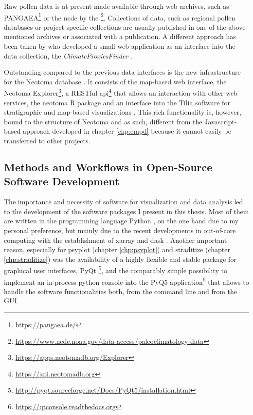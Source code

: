 \begin{refsection}
Raw pollen data is at present made available through web archives, such as PANGAEA\footnote{\url{https://pangaea.de/}} or the \gls{ncdc} by the \footnote{\url{https://www.ncdc.noaa.gov/data-access/paleoclimatology-data}}. Collections of data, such as regional pollen databases or project specific collections \citep[e.g.][]{WhitmoreGajewskiSawadaEtAl2005, DavisZanonCollinsEtAl2013} are usually published in one of the above-mentioned archives or associated with a publication. A different approach has been taken by \cite{BollietBrockmannMassonDelmotteEtAl2016} who developed a small web application as an interface into the data collection, the \textit{ClimateProxiesFinder} \citep[chapter \ref{chp:empd}]{Brockmann2016}.

Outstanding compared to the previous data interfaces is the new infrastructure for the Neotoma database \citep{WilliamsGrimmBloisEtAl2018}. It consists of the map-based web interface, the Neotoma Explorer\footnote{\url{https://apps.neotomadb.org/Explorer}}, a RESTful api\footnote{\url{https://api.neotomadb.org}} that allows an interaction with other web services, the neotoma R package \citep{GoringDawsonSimpsonEtAl2015} and an interface into the Tilia software for stratigraphic and map-based visualizations \citep{WilliamsGrimmBloisEtAl2018}. This rich functionality is, however, bound to the structure of Neotoma and as such, different from the Javascript-based approach developed in chapter \ref{chp:empd} because it cannot easily be transferred to other projects.


\subsection{Methods and Workflows in Open-Source Software Development} \label{sec:intro-software-tools}

The importance and necessity of software for visualization and data analysis led to the development of the software packages I present in this thesis. Most of them are written in the programming language Python \citep{PerezGrangerHunter2011}, on the one hand due to my personal preference, but mainly due to the recent developments in out-of-core computing with the establishment of xarray and dask \citep{HoyerHamman2017, DDT2016, Rocklin2015}. Another important reason, especially for psyplot (chapter \ref{chp:psyplot}) and straditize (chapter \ref{chp:straditize}) was the availability of a highly flexible and stable package for graphical user interfaces, PyQt \footnote{\url{http://pyqt.sourceforge.net/Docs/PyQt5/installation.html}}, and the comparably simple possibility to implement an in-process python console into the PyQ5 application\footnote{\url{https://qtconsole.readthedocs.org}} that allows to handle the software functionalities both, from the command line and from the GUI.


\end{refsection}
